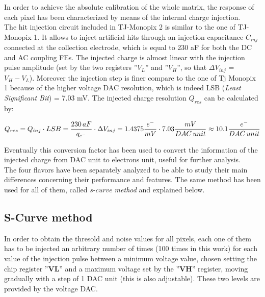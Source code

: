 In order to achieve the absolute calibration of the whole matrix, the response of each pixel has been characterized by means of the internal charge injection. \\

The hit injection circuit included in TJ-Monopix 2 is similar to the one of TJ-Monopix 1. It allows to inject artificial hits through an injection capacitance \textbf{$C_{inj}$} connected at the collection electrode, which is equal to 230 aF for both the DC and AC coupling FEs. The injected charge is almost linear with the injection pulse amplitude (set by the two registers ''\textbf{$V_{L}$}'' and ''\textbf{$V_{H}$}'', so that $\Delta V_{inj}$ = \textbf{$V_{H}-V_{L}$}). Moreover the injection step is finer compare to the one of Tj Monopix 1 because of the higher voltage DAC resolution, which is indeed LSB (\textit{Least Significant Bit}) = 7.03 mV. 
The injected charge resolution $Q_{res}$ can be calculated by:

\begin{equation}
\small
Q_{res} = Q_{inj} \cdot LSB= \frac{230 \, aF}{q_{{e}^{-}}} \cdot \Delta V_{inj} = 1.4375 \frac{e^{-}}{mV} \cdot 7.03 \frac{mV}{DAC \, unit} \approx 10.1 \frac{e^{-}}{DAC \, unit}  
\label{conversion_factor}
\end{equation}

Eventually this conversion factor has been used to convert the information of the injected charge from DAC unit to electrons unit, useful for further analysis.
\\
The four flavors have been separately analyzed to be able to study their main differences concerning their performance and features. The same method has been used for all of them, called \textit{s-curve method} and explained below. 


\subsection{S-Curve method} \label{threshold_subsection}

In order to obtain the thresold and noise values for all pixels, each one of them has to be injected an arbitrary number of times (100 times in this work) for each value of the injection pulse between a minimum voltage value, chosen setting the chip register ''\textbf{VL}'' and a maximum voltage set by the ''\textbf{VH}'' register, moving gradually with a step of 1 DAC unit (this is also adjustable). These two levels are provided by the voltage DAC.

